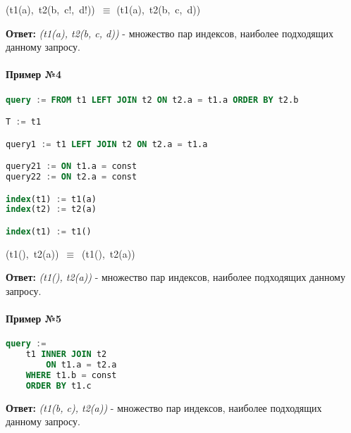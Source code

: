 (t1(a), t2(b, c!, d!)) $\equiv$ (t1(a), t2(b, c, d)) 

\textbf{Ответ:} \textit{(t1(a), t2(b, c, d))} - множество пар индексов, наиболее подходящих данному запросу.


\paragraph{Пример №4}
\begin{lstlisting}[language=SQL]
query := FROM t1 LEFT JOIN t2 ON t2.a = t1.a ORDER BY t2.b

T := t1 

query1 := t1 LEFT JOIN t2 ON t2.a = t1.a 

query21 := ON t1.a = const 
query22 := ON t2.a = const 

index(t1) := t1(a) 
index(t2) := t2(a) 

index(t1) := t1() 
\end{lstlisting}
 
(t1(), t2(a)) $\equiv$ (t1(), t2(a)) 

\textbf{Ответ:} \textit{(t1(), t2(a))} - множество пар индексов, наиболее подходящих данному запросу.


\paragraph{Пример №5}
\begin{lstlisting}[language=SQL]
query := 
    t1 INNER JOIN t2
        ON t1.a = t2.a
    WHERE t1.b = const
    ORDER BY t1.c
\end{lstlisting}

\textbf{Ответ:} \textit{(t1(b, c), t2(a))} - множество пар индексов, наиболее подходящих данному запросу.





